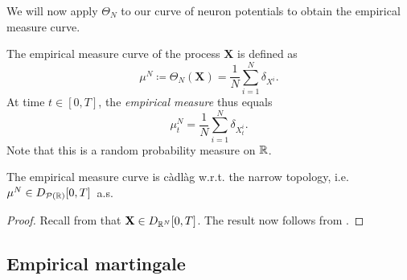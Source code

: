 We will now apply \(\Theta_N\) to our curve of neuron potentials to obtain the empirical measure curve.
\begin{definition}\label{def:emp-measure}
  The empirical measure curve of the process \(\bm{X}\) is defined as
  \begin{equation}
    \mu^N \coloneqq \Theta_N(\bm{X}) = \frac{1}{N} \sum_{i=1}^N \delta_{X^i}.
  \end{equation}
  At time \(t \in [0,T]\), the \textit{empirical measure} thus equals
  \begin{equation}
    \mu_t^N = \frac{1}{N} \sum_{i=1}^N \delta_{X_t^i}.
  \end{equation}
  Note that this is a random probability measure on \( \mathbb{R} \).
\end{definition}

\begin{corollary}
  The empirical measure curve is càdlàg w.r.t. the narrow topology, i.e.\ \( \mu^N \in D_{\mathcal{P}(\mathbb{R})}[0,T] \)~a.s.
\end{corollary}
\begin{proof}
  Recall from  that \(\mathbf{X} \in D_{\mathbb{R}^N}[0,T]\).
  The result now follows from .
\end{proof}


\subsection{Empirical martingale}\label{subsec:emp-mart}

